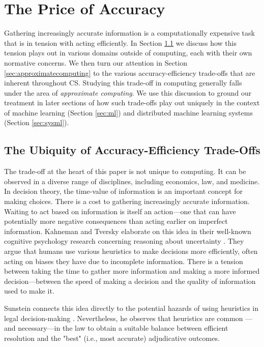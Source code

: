\documentclass[sigplan,screen]{acmart}
\begin{document}
\section{The Price of Accuracy} \label{sec:price}
Gathering increasingly accurate information is a computationally expensive task that is in tension with acting efficiently. In Section \ref{sec:common} we discuss how this tension plays out in various domains outside of computing, each with their own normative concerns. We then turn our attention in Section \ref{sec:approximatecomputing} to the various accuracy-efficiency trade-offs that are inherent throughout CS. Studying this trade-off in computing generally falls under the area of \emph{approximate computing}. We use this discussion to ground our treatment in later sections of how such trade-offs play out uniquely in the context of machine learning (Section \ref{sec:ml}) and distributed machine learning systems (Section \ref{sec:sysml}).

\subsection{The Ubiquity of Accuracy-Efficiency Trade-Offs} \label{sec:common}
The trade-off at the heart of this paper is not unique to computing. It can be observed in a diverse range of disciplines, including economics, law, and medicine. In decision theory, the time-value of information is an important concept for making choices. There is a cost to gathering increasingly accurate information. Waiting to act based on information is itself an action---one that can have potentially more negative consequences than acting earlier on imperfect information. Kahneman and Tversky elaborate on this idea in their well-known cognitive psychology research concerning reasoning about uncertainty \cite{kahneman1982uncertainty}. They argue that humans use various heuristics to make decisions more efficiently, often acting on biases they have due to incomplete information. There is a tension between taking the time to gather more information and making a more informed decision---between the speed of making a decision and the quality of information used to make it.

Sunstein connects this idea directly to the potential hazards of using heuristics in legal decision-making \cite{sunstein2002heuristics}. Nevertheless, he observes that heuristics are common --- and necessary---in the law to obtain a suitable balance between efficient resolution and the "best" (i.e., most accurate) adjudicative outcomes.
\end{document}
